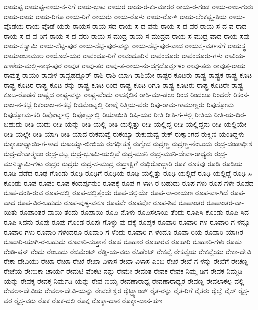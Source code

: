 ರಾಯಪ್ಪ
ರಾಯಪ್ಪ-ನಾಯ-ಕ-ನಿಗೆ
ರಾಯ-ಭಾಟ
ರಾಯರ
ರಾಯ-ರ-ಕು-ಮಾರರ
ರಾಯ-ರ-ಗಂಡ
ರಾಯ-ರಾಜ-ಗುರು
ರಾಯ-ರಾಯ
ರಾಯ-ರಿಗೂ
ರಾಯ-ರಿಗೆ
ರಾಯರು
ರಾಯ-ರೊಳು
ರಾಯ-ರೊಳ್
ರಾಯ-ಲೆಂಕಪ್ಪೃ-ತಿಯ
ರಾಯ-ವೊಡೆಯ
ರಾಯ-ವೊಡೆ-ಯರು
ರಾಯಸ
ರಾಯ-ಸದ
ರಾಯ-ಸ-ದ-ವನು
ರಾಯ-ಸ-ದ-ವರ
ರಾಯ-ಸ-ದ-ವ-ರಾದ
ರಾಯ-ಸ-ದ-ವ-ರಿಗೆ
ರಾಯ-ಸ-ದ-ವರು
ರಾಯ-ಸ-ಮುದ್ರ
ರಾಯ-ಸ-ಮುದ್ರದ
ರಾಯ-ಸ-ಮುದ್ರ-ವಾದ
ರಾಯ-ಸವು
ರಾಯ-ಸಸ್ವಾಮಿ
ರಾಯ-ಸೆಟ್ಟಿ-ಪುರ
ರಾಯ-ಸೆಟ್ಟಿ-ಪುರ-ವನ್ನು
ರಾಯ-ಸೆಟ್ಟಿ-ಪುರ-ವಾದ
ರಾಯಸ್ತ-ವರ್ತನೆಗೆ
ರಾಯಸ್ಥ
ರಾಯಾಂಬಾಮುಲ
ರಾಯೊಡೆ-ಯರ
ರಾವಂದೂ-ರಿಗೆ
ರಾವಂದೂರಿನ
ರಾವಂದೂರು
ರಾವಂದೂರು-ಗಳು
ರಾವಿಯ-ಹಾಳೆಯ-ಮಲ್ಲಿ-ನಾಥ-ಪುರ
ರಾವುತ
ರಾವು-ತರ
ರಾವು-ತ-ರಾಯ-ನು-ದಗ್ರದೊರ್ವ್ವಳಂ
ರಾವು-ತರು
ರಾವುತ್ತ-ರಾಯ
ರಾವುತ್ತ-ರಾಯಂ
ರಾವುಳ
ರಾವ್ಬಹದ್ದೂರ್
ರಾಶಿ
ರಾಶಿ-ಯಾಗಿ
ರಾಶಿಯೇ
ರಾಷ್ಟರ-ಕೂಟರು
ರಾಷ್ಟ್ರ
ರಾಷ್ಟ್ರಕ
ರಾಷ್ಟ್ರ-ಕೂಟ
ರಾಷ್ಟ್ರ-ಕೂಟರ
ರಾಷ್ಟ್ರ-ಕೂಟ-ರನ್ನು
ರಾಷ್ಟ್ರ-ಕೂಟ-ರಿಂದ
ರಾಷ್ಟ್ರ-ಕೂಟ-ರಿಗೂ
ರಾಷ್ಟ್ರ-ಕೂಟರು
ರಾಷ್ಟ್ರ-ಕೂಟರೇ
ರಾಷ್ಟ್ರ-ಕೂಟ-ರೊಡನೆ
ರಾಷ್ಟ್ರದ
ರಾಷ್ಟ್ರ-ವನ್ನು
ರಾಷ್ಟ್ರ-ವೆಂದು
ರಾಸಕ್ಕಲಿನ
ರಾಸಿ-ಮಾ-ಡಲು
ರಿಂದ
ರಿಂದಲೂ
ರಿಂದಲೇ
ರಿಕಂನ-ರಾಜ-ನ-ಕಟ್ಟೆ
ರಿಕಂರಾಜ-ನ-ಕಟ್ಟೆ
ರಿಜಿಮೆಂಟ್ನಲ್ಲಿ
ರಿಣಕ್ಕೆ
ರಿತ್ತಿಯ-ವರು
ರಿಪು-ರಾಮ-ಗಾಮುಣ್ಡರು
ರಿಪುಸ್ತೋಮ
ರಿಪುಸ್ತೋಮ-ಕರಿ
ರಿಪೋರ್ಟ್ನಲ್ಲಿ
ರಿಪೋರ್ಟ್ರಲ್ಲಿ
ರಿಯಾಯಿತಿ
ರಿಷಿ-ಯರ
ರೀತಿ
ರೀತಿ-ಗ-ಳಲ್ಲಿ
ರೀತಿಯ
ರೀತಿ-ಯ-ದಿರ-ಬಹುದು
ರೀತಿ-ಯದು
ರೀತಿ-ಯನ್ನು
ರೀತಿ-ಯಲ್ಲಿ
ರೀತಿ-ಯಲ್ಲಿತ್ತು
ರೀತಿ-ಯಲ್ಲಿದ್ದ
ರೀತಿ-ಯಲ್ಲಿದ್ದನು
ರೀತಿ-ಯಲ್ಲಿಯೇ
ರೀತಿ-ಯಲ್ಲೇ
ರೀತಿ-ಯಾಗಿ
ರೀತಿ-ಯಾದ
ರುಕಮವ್ವೆ
ರುಕಯ್ಯಾ
ರುಕುಮವ್ವೆ
ರುಕ್
ರುಕ್ಮಾಂಗದ
ರುಕ್ಮಿಣಿ-ಯಂತಿದ್ದಳು
ರುಕ್ಶಾಖಾಧ್ಯಾಯಿ-ಗ-ಳಾದ
ರುಖಯ್ಯಾ-ಬೀಬಿಯ
ರುಗಧೀತಶ್ಚ
ರುಗ್ವೇದ
ರುದ್ರಣ್ಣ
ರುದ್ರಣ್ಣ-ನೆಂಬುದು
ರುದ್ರ-ದಂಡಾಧೀಶ
ರುದ್ರ-ದೇವಾತ್ಮಜಂ
ರುದ್ರ-ಭಟ್ಟ
ರುದ್ರ-ಭೂಮಿ-ಯಲ್ಲಿವೆ
ರುದ್ರ-ಮುನಿ
ರುದ್ರ-ಮುನಿ-ದೇವಾ-ರಾಧ್ಯರು
ರುದ್ರ-ಮುನಿಸ್ವಾಮಿ-ಗಳು
ರುದ್ರರ
ರುದ್ರರು
ರುದ್ರ-ಸ-ಮುದ್ರ
ರುದ್ರಾಕ್ಷಿಗೆ
ರುಧಿರೋದ್ಗಾರಿ
ರೂಕ
ರೂಕವು
ರೂಡಿ
ರೂಡಿಯ
ರೂಡಿ-ವಡೆದ
ರೂಢ-ಗೊಂಡು
ರೂಢಿ
ರೂಢಿಗೆ
ರೂಢಿಯ
ರೂಢಿ-ಯಲ್ಲಿತ್ತು
ರೂಢಿ-ಯಲ್ಲಿದೆ
ರೂಢಿ-ಯಲ್ಲಿದ್ದೆ
ರೂಢಿ-ಸಿ-ಕೊಂಡು
ರೂಪ
ರೂಪಂ
ರೂಪ-ಕಂದರ್ಪ್ಪನುಂ
ರೂಪಕ್ಕೆ
ರೂಪ-ಗ-ಳಾಗಿ-ರ-ಬಹುದು
ರೂಪ-ಗಳು
ರೂಪ-ಗಳೇ
ರೂಪದ
ರೂಪ-ದಂತಿ-ರುವ
ರೂಪ-ದಲ್ಲಿ
ರೂಪ-ದಲ್ಲಿತ್ತೆಂದು
ರೂಪ-ದಲ್ಲಿಯೇ
ರೂಪ-ನಾ-ರಾಯಣ
ರೂಪ-ವಾ-ಗಿದೆ
ರೂಪ-ವಾದ
ರೂಪ-ವಿರ-ಬಹುದು
ರೂಪ-ವುಳ್ಳ-ವನೂ
ರೂಪವೇ
ರೂಪವೋ
ರೂಪ-ಶಿವ
ರೂಪಾಂತರ
ರೂಪಾಂತರ-ವಾ-ಯಿತು
ರೂಪಾಂತರ-ವಾಯಿ-ತೆಂದು
ರೂಪಾಯಿ
ರೂಪಿ-ನೊಳು
ರೂಪಿಸಲಾಯಿ-ತೆಂದು
ರೂಪಿಸಿ-ಕೊಂಡು
ರೂಪಿ-ಸಿದ
ರೂಪಿ-ಸಿದನು
ರೂಪು
ರೂಪು-ಗೊಂಡ
ರೂಪು-ಗೊಳ್ಳು-ವು-ದಕ್ಕೆ
ರೂಪ್ಯಕ
ರೂವಾರಿ
ರೂವಾರಿ-ಗಳ
ರೂವಾರಿ-ಗ-ಳನ್ನೂ
ರೂವಾರಿ-ಗಳು
ರೂವಾರಿ-ಗಳೆಂದರೂ
ರೂವಾರಿ-ಗ-ಳೆಂದು
ರೂವಾರಿ-ಗ-ಳೆಂದೂ
ರೂವಾ-ರಿಯ
ರೂವಾರಿ-ಯಾಗಿರ
ರೂವಾರಿ-ಯಾಗಿ-ರ-ಬಹುದು
ರೂವಾರಿ-ಸುತ್ತಾನೆ
ರೂಹ
ರೂಹಾರ
ರೂಹಾರವ
ರೂಹಾರಿ
ರೂಹಾರಿ-ಗಳು
ರೂಹು
ರೆಂಡಿ-ಷನ್
ರೆಂದು
ರೆಂಬುದು
ರೆಜಿಮೆಂಟ್
ರೆಡ್ಡಿ-ಯ-ವರು
ರೆಸಿಡೆಂಟ್
ರೇಕವ್ವೆ
ರೇಕವ್ವೆಯ
ರೇಕವ್ವೆಯು
ರೇಕಾ-ದೇವಿ
ರೇಕಾ-ದೇವಿಯು
ರೇಖಾ
ರೇಖಾ-ರೇಖೆ
ರೇಖಾ-ವಿಳಾಸ
ರೇಖಾ-ವಿಳಾಸ-ಎಂಬ
ರೇಖೆ
ರೇಖೆ-ಗ-ಳನ್ನು
ರೇಖೆಗೆ
ರೇಚಣ್ಣ
ರೇಚೆಯ
ರೇಣುಕಾ-ಚಾರ್ಯ
ರೇಮಟಿ-ವೆಂಕಟ-ನನ್ನು
ರೇಮೇ
ರೇವಂತ
ರೇವಕ
ರೇವಕ-ನಿಮ್ಮ-ಡಿಗೆ
ರೇವಕ-ನಿಮ್ಮಡಿ-ಯನ್ನು
ರೇವಕ್ಕ
ರೇವಕ್ಕ-ನಿರ್ಮಡಿ-ಯನ್ನು
ರೇವ-ಣಯ್ಯ
ರೇವಣಾರಾಧ್ಯ
ರೇವಣಾರಾಧ್ಯರ
ರೇವಣ್ಣ
ರೇವಲಾಕಲ್ಪ-ವಲ್ಲಿ
ರೇವಲಾ-ದೇವಿಯ
ರೇವಲಾ-ದೇವಿ-ಯನ್ನು
ರೇವಲೇಶ್ವರ
ರೈಟ್ಹ್ಯಾಂಡ್
ರೈತ-ರನ್ನು
ರೈತ-ರಿಗೆ
ರೈತರು
ರೈಲ್ವೆ
ರೈಸ್
ರೈಸ್ರ-ವರ
ರೈಸ್ರ-ವರು
ರೊಕ
ರೊಕ-ದಲಿ
ರೊಕ್ಕ
ರೊಕ್ಕಾ-ದಾನ
ರೊಕ್ಕಾ-ದಾನ-ಹಣ
